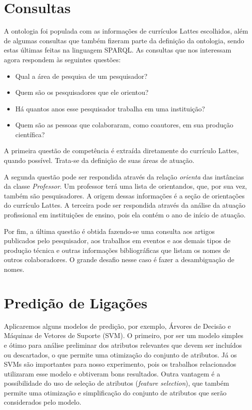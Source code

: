\section{Consultas}
\label{sec:desenvolvimento-consultas}

A ontologia foi populada com as informações de currículos Lattes escolhidos, além de algumas consultas que também fizeram parte da definição da ontologia, sendo estas últimas feitas na linguagem SPARQL. As consultas que nos interessam agora respondem às seguintes questões:

\begin{itemize}
    \item Qual a área de pesquisa de um pesquisador?
    \item Quem são os pesquisadores que ele orientou?
    \item Há quantos anos esse pesquisador trabalha em uma instituição?
    \item Quem são as pessoas que colaboraram, como coautores, em sua produção científica?
\end{itemize}

A primeira questão de competência é extraída diretamente do currículo Lattes, quando possível. Trata-se da definição de suas áreas de atuação.

A segunda questão pode ser respondida através da relação \textit{orienta} das instâncias da classe \textit{Professor}. Um professor terá uma lista de orientandos, que, por sua vez, também são pesquisadores. A origem dessas informações é a seção de orientações do currículo Lattes. A terceira pode ser respondida através da análise da atuação profissional em instituições de ensino, pois ela contém o ano de início de atuação.

Por fim, a última questão é obtida fazendo-se uma consulta aos artigos publicados pelo pesquisador, aos trabalhos em eventos e aos demais tipos de produção técnica e outras informações bibliográficas que listam os nomes de outros colaboradores. O grande desafio nesse caso é fazer a desambiguação de nomes.

\section{Predição de Ligações}
\label{sec:desenvolvimento-predicao}

Aplicaremos alguns modelos de predição, por exemplo, Árvores de Decisão e  Máquinas de Vetores de Suporte (SVM). O primeiro, por ser um modelo simples e ótimo para análise preliminar dos atributos relevantes que devem ser incluídos ou descartados, o que permite uma otimização do conjunto de atributos. Já os SVMs são importantes para nosso experimento, pois os trabalhos relacionados utilizaram esse modelo e obtiveram bons resultados. Outra vantagem é a possibilidade do uso de seleção de atributos (\textit{feature selection}), que também permite uma otimização e simplificação do conjunto de atributos que serão considerados pelo modelo.

